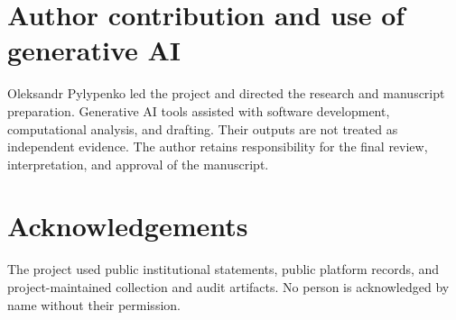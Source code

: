 \section*{Author contribution and use of generative AI}
Oleksandr Pylypenko led the project and directed the research and manuscript preparation. Generative AI tools assisted with software development, computational analysis, and drafting. Their outputs are not treated as independent evidence. The author retains responsibility for the final review, interpretation, and approval of the manuscript.

\section*{Acknowledgements}
The project used public institutional statements, public platform records, and project-maintained collection and audit artifacts. No person is acknowledged by name without their permission.

